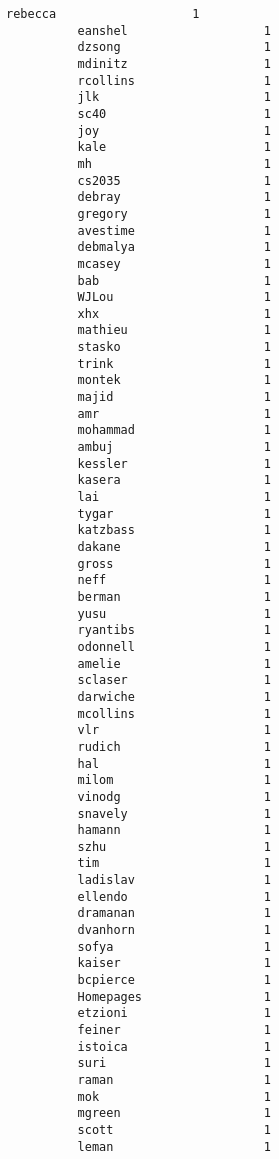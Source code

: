 \documentclass[11pt]{article}
\begin{document}
\begin{Verbatim}[commandchars=\\\{\}]
          rebecca                   1
          eanshel                   1
          dzsong                    1
          mdinitz                   1
          rcollins                  1
          jlk                       1
          sc40                      1
          joy                       1
          kale                      1
          mh                        1
          cs2035                    1
          debray                    1
          gregory                   1
          avestime                  1
          debmalya                  1
          mcasey                    1
          bab                       1
          WJLou                     1
          xhx                       1
          mathieu                   1
          stasko                    1
          trink                     1
          montek                    1
          majid                     1
          amr                       1
          mohammad                  1
          ambuj                     1
          kessler                   1
          kasera                    1
          lai                       1
          tygar                     1
          katzbass                  1
          dakane                    1
          gross                     1
          neff                      1
          berman                    1
          yusu                      1
          ryantibs                  1
          odonnell                  1
          amelie                    1
          sclaser                   1
          darwiche                  1
          mcollins                  1
          vlr                       1
          rudich                    1
          hal                       1
          milom                     1
          vinodg                    1
          snavely                   1
          hamann                    1
          szhu                      1
          tim                       1
          ladislav                  1
          ellendo                   1
          dramanan                  1
          dvanhorn                  1
          sofya                     1
          kaiser                    1
          bcpierce                  1
          Homepages                 1
          etzioni                   1
          feiner                    1
          istoica                   1
          suri                      1
          raman                     1
          mok                       1
          mgreen                    1
          scott                     1
          leman                     1

\end{Verbatim}
\end{document}
